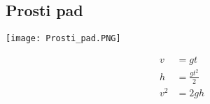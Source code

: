 {\color{indiagreen}\subsection{Prosti pad}}
\begin{center}
	\texttt{[image: Prosti\_pad.PNG]}
\end{center}
\begin{align*}
	v &= gt\\
	h &= \frac{gt^2}{2}\\
	v^2 &= 2gh\\
\end{align*}